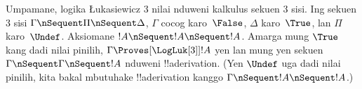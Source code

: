 \documentclass[../../../include/open-logic-section]{subfiles}
\begin{document}
Umpamane, logika \L ukasiewicz $3$ nilai nduweni
kalkulus sekuen $3$ sisi. Ing sekuen $3$ sisi
$\Gamma \nSequent \Pi \nSequent \Delta$, $\Gamma$ cocog
karo~$\False$, $\Delta$ karo~$\True$, lan $\Pi$ karo~$\Undef$.
Aksiomane $!A \nSequent !A \nSequent !A$. Amarga mung
$\True$ kang dadi nilai pinilih, $\Gamma \Proves[\LogLuk[3]] !A$
yen lan mung yen sekuen $\Gamma \nSequent \Gamma \nSequent !A$
nduweni !!a{derivation}. (Yen $\Undef$ uga dadi nilai pinilih,
kita bakal mbutuhake !!a{derivation} kanggo
$\Gamma \nSequent !A \nSequent !A$.)
\end{document}
